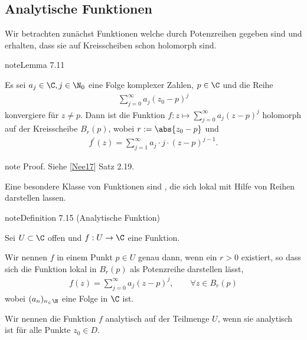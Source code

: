 \documentclass[letterpaper,10pt,german]{jupyterBook}
\begin{document}
\subsection{Analytische Funktionen}
\label{\detokenize{complexanalysis/powerseries:analytische-funktionen}}
\sphinxAtStartPar
Wir betrachten zunächst Funktionen welche durch Potenzreihen gegeben sind und erhalten, dass sie auf Kreisscheiben schon holomorph sind.
\label{complexanalysis/powerseries:lem:potseries}
\begin{sphinxadmonition}{note}{Lemma 7.11}



\sphinxAtStartPar
Es sei \(a_j\in\C, j\in\N_0\) eine Folge komplexer Zahlen, \(p\in\C\) und die Reihe
\begin{equation*}
\begin{split}\sum_{j=0}^\infty a_j (z_0-p)^j \end{split}
\end{equation*}
\sphinxAtStartPar
konvergiere für \(z\neq p\). Dann ist die Funktion \(f:z\mapsto \sum_{j=0}^\infty a_j (z-p)^j\) holomorph auf der Kreisscheibe \(B_r(p)\), wobei \(r:=\abs{z_0-p}\) und
\begin{equation*}
\begin{split}f^\prime(z) = \sum_{j=1}^\infty a_j\cdot j\cdot (z-p)^{j-1}.\end{split}
\end{equation*}\end{sphinxadmonition}

\begin{sphinxadmonition}{note}
\sphinxAtStartPar
Proof. Siehe {[}\hyperlink{cite.references:id13}{Nee17}{]} Satz 2.19.
\end{sphinxadmonition}

\sphinxAtStartPar
Eine besondere Klasse von Funktionen sind , die sich lokal mit Hilfe von Reihen darstellen lassen.
\label{complexanalysis/powerseries:definition-1}
\begin{sphinxadmonition}{note}{Definition 7.15 (Analytische Funktion)}



\sphinxAtStartPar
Sei \(U \subset \C\) offen und \(f: U\to \C\) eine Funktion.

\sphinxAtStartPar
Wir nennen \(f\)  in einem Punkt \(p \in U\) genau dann, wenn ein \(r > 0\) existiert, so dass sich die Funktion lokal in \(B_r(p)\) als Potenzreihe darstellen lässt,
\begin{equation*}
\begin{split}f(z) = \sum_{j=0}^\infty a_j (z-p)^j, \qquad \forall z\in B_r(p)\end{split}
\end{equation*}
\sphinxAtStartPar
wobei \((a_n)_{n_\in\N}\) eine Folge in \(\C\) ist.

\sphinxAtStartPar
Wir nennen die Funktion \(f\) analytisch auf der Teilmenge \(U\), wenn sie analytisch ist für alle Punkte \(z_0 \in D\).
\end{sphinxadmonition}
\end{document}

